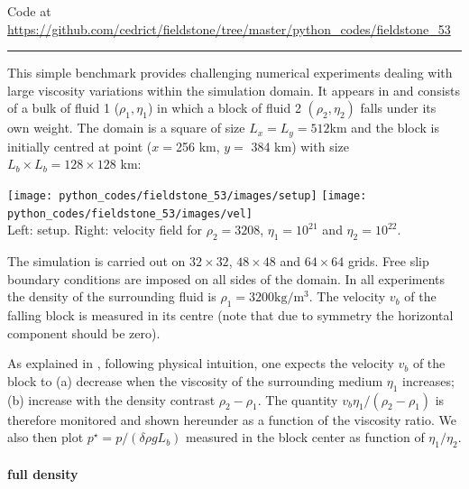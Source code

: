 

\begin{center}
Code at \url{https://github.com/cedrict/fieldstone/tree/master/python_codes/fieldstone_53}
\end{center}

\par\noindent\rule{\textwidth}{0.4pt}

This simple benchmark provides challenging numerical experiments 
dealing with large viscosity variations within the simulation
domain. It appears in \cite{gery10} and consists of a bulk of fluid 1 ($\rho_1,\eta_1$)
in which a block of fluid 2 $(\rho_2,\eta_2)$ falls under its own
weight. The domain is a square of size $L_x=L_y=512$km and the
block is initially centred at point ($x=$256 km, $y=$ 384 km) with size
$L_b\times L_b = 128\times 128$ km:

\begin{center}
\texttt{[image: python\_codes/fieldstone\_53/images/setup]}
\texttt{[image: python\_codes/fieldstone\_53/images/vel]}\\
{\captionfont Left: setup. Right: velocity field for $\rho_2=3208$, $\eta_1=10^{21}$
and $\eta_2=10^{22}$.}
\end{center}

The simulation is carried out on $32\times32$, $48\times48$ and $64\times 64$ grids. Free slip
boundary conditions are imposed on all sides of the domain. 
In all experiments the density of the surrounding fluid is $\rho_1=3200\text{kg}/\text{m}^3$.
The velocity $v_b$ of the falling block is measured in its centre (note that due to symmetry 
the horizontal component should be zero).

As explained in \cite{thie11}, following physical intuition, one expects 
the velocity $v_b$ of the block to (a) decrease when the viscosity
of the surrounding medium $\eta_1$ increases; (b) increase with the
density contrast $\rho_2-\rho_1$. 
The quantity $v_b \eta_1/(\rho_2-\rho_1)$ is therefore monitored and shown hereunder as a function of 
the viscosity ratio.
We also then plot $p^\star=p/(\delta \rho g L_b)$ measured in the block center 
as function of $\eta_1/\eta_2$. 

\paragraph{full density}

